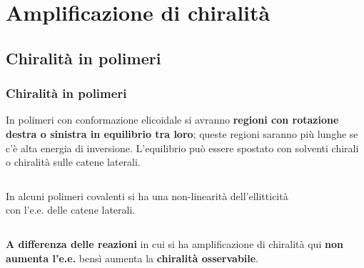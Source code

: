 \section{Amplificazione di chiralità}
\subsection{Chiralità in polimeri}\begin{frame}\frametitle{Chiralità in polimeri}
In polimeri con conformazione elicoidale si avranno {\bf regioni con rotazione destra o sinistra in equilibrio tra loro}; queste regioni saranno più lunghe se c'è alta energia di inversione. L'equilibrio può essere spostato con solventi chirali o chiralità sulle catene laterali.
\begin{columns}
In alcuni polimeri covalenti si ha una non-linearità dell'ellitticità con l'e.e. delle catene laterali. \cite{green}
\begin{figure}{}\end{figure}\end{columns}\vspace{10pt}
\textbf{A differenza delle reazioni} in cui si ha amplificazione di chiralità qui \textbf{non aumenta l'e.e.} bensì aumenta la \textbf{chiralità osservabile}.

             \end{frame}
